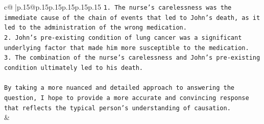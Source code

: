 \documentclass{article}
\begin{document}
{\begin{supertabular}{c@{$\;$}|p{.15\linewidth}@{}p{.15\linewidth}p{.15\linewidth}p{.15\linewidth}p{.15\linewidth}p{.15\linewidth}}
{{{\texttt{1. The nurse's carelessness was the immediate cause of the chain of events that led to John's death, as it led to the administration of the wrong medication.} \\
\texttt{2. John's pre{-}existing condition of lung cancer was a significant underlying factor that made him more susceptible to the medication.} \\
\texttt{3. The combination of the nurse's carelessness and John's pre{-}existing condition ultimately led to his death.} \\
\\ 
\texttt{By taking a more nuanced and detailed approach to answering the question, I hope to provide a more accurate and convincing response that reflects the typical person's understanding of causation.} \\
            }
        }
    }
    & \\ \\

\end{supertabular}
}
\end{document}
